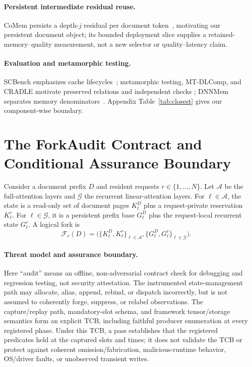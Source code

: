 \documentclass{article}
\begin{document}
\paragraph{Persistent intermediate residual reuse.}
CoMem persists a depth-$j$ residual per document token~\citep{liu2026comem,
liu2026understanding}, motivating our persistent document object; its bounded
deployment slice supplies a retained-memory--quality measurement, not a new
selector or quality--latency claim.

\paragraph{Evaluation and metamorphic testing.}
SCBench emphasizes cache lifecycles~\citep{li2025scbench}; metamorphic testing,
MT-DLComp, and CRADLE motivate preserved relations and independent checks
\citep{chen2018metamorphic,xiao2022metamorphic,pham2019cradle}; DNNMem separates
memory denominators~\citep{gao2020dnnmem}.  Appendix Table~\ref{tab:closest}
gives our component-wise boundary.

\section{The ForkAudit Contract and Conditional Assurance Boundary}
\label{sec:contract}

Consider a document prefix $D$ and resident requests
$r\in\{1,\ldots,N\}$.  Let $\mathcal{A}$ be the full-attention layers and
$\mathcal{G}$ the recurrent linear-attention layers.  For
$\ell\in\mathcal{A}$, the state is a read-only set of document pages
$K^D_\ell$ plus a request-private reservation $K^r_\ell$.  For
$\ell\in\mathcal{G}$, it is a persistent prefix base $G^D_\ell$ plus the
request-local recurrent state $G^r_\ell$.  A logical fork is
\begin{equation}
  \mathcal{F}_r(D) =
  \bigl(\{K^D_\ell,K^r_\ell\}_{\ell\in\mathcal{A}},
        \{G^D_\ell,G^r_\ell\}_{\ell\in\mathcal{G}}\bigr).
\end{equation}

\paragraph{Threat model and assurance boundary.}
Here ``audit'' means an offline, non-adversarial contract check for debugging
and regression testing, not security attestation.  The instrumented
state-management path may allocate, alias, append, rebind, or dispatch
incorrectly, but is not assumed to coherently forge, suppress, or relabel
observations.  The capture/replay path, mandatory-slot schema, and framework
tensor/storage semantics form an explicit TCB, including faithful producer
enumeration at every registered phase.  Under this TCB, a pass establishes
that the registered predicates held at the captured slots and times; it does
not validate the TCB or protect against coherent omission/fabrication,
malicious-runtime behavior, OS/driver faults, or unobserved transient writes.
\end{document}

